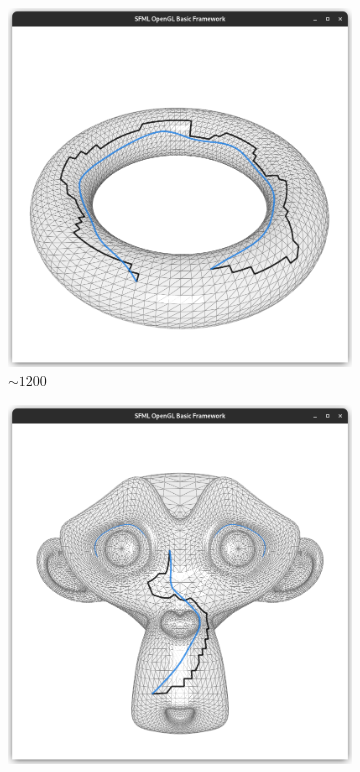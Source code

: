\documentclass{stdlocal}
\begin{document}
\begin{figure}
  \centering
  \begin{subfigure}[b]{0.24\linewidth}
    \centering
    \includegraphics[width=\linewidth,trim={15px 20 15 50},clip]{images/torus-smooth-0.5.png}
    \caption{$\sim 1200$}
  \end{subfigure}
  \begin{subfigure}[b]{0.24\linewidth}
    \centering
    \includegraphics[width=\linewidth,trim={15px 20 15 50},clip]{images/suzanne-smooth-0.5.png}

\end{subfigure}
\end{figure}
\end{document}
